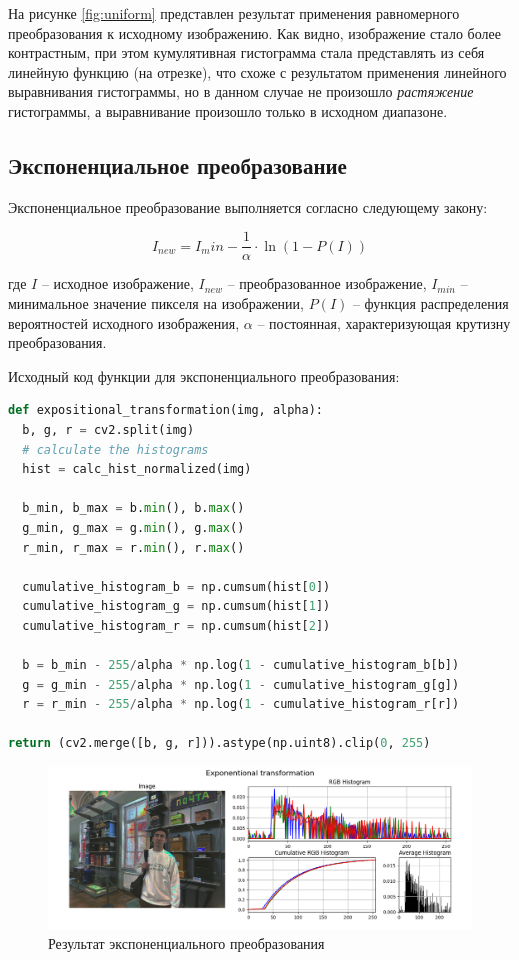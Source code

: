 На рисунке \ref{fig:uniform} представлен результат применения равномерного преобразования к исходному изображению. 
Как видно, изображение стало более контрастным, при этом кумулятивная гистограмма стала представлять из себя
линейную функцию (на отрезке), что схоже с результатом применения линейного выравнивания гистограммы, но 
в данном случае не произошло \textit{растяжение} гистограммы, а выравнивание произошло только в исходном диапазоне. 


\subsection{Экспоненциальное преобразование}

Экспоненциальное преобразование выполняется согласно следующему закону:

\begin{equation}
  I_{new} = I_min - \frac{1}{\alpha} \cdot \ln(1 - P(I))
\end{equation}

где $I$ -- исходное изображение, $I_{new}$ -- преобразованное изображение, 
$I_{min}$ -- минимальное значение пикселя на изображении, 
$P(I)$ -- функция распределения вероятностей исходного изображения,
$\alpha$ -- постоянная, характеризующая крутизну преобразования. 

Исходный код функции для экспоненциального преобразования:

\begin{lstlisting}[language=Python]
def expositional_transformation(img, alpha):
  b, g, r = cv2.split(img)
  # calculate the histograms
  hist = calc_hist_normalized(img)

  b_min, b_max = b.min(), b.max()
  g_min, g_max = g.min(), g.max()
  r_min, r_max = r.min(), r.max()

  cumulative_histogram_b = np.cumsum(hist[0]) 
  cumulative_histogram_g = np.cumsum(hist[1])
  cumulative_histogram_r = np.cumsum(hist[2])

  b = b_min - 255/alpha * np.log(1 - cumulative_histogram_b[b]) 
  g = g_min - 255/alpha * np.log(1 - cumulative_histogram_g[g]) 
  r = r_min - 255/alpha * np.log(1 - cumulative_histogram_r[r]) 

return (cv2.merge([b, g, r])).astype(np.uint8).clip(0, 255)
\end{lstlisting}

\begin{figure}[H]
    \centering
    \includegraphics[width=\textwidth]{../results/Exponentional transformation.png}
    \caption{Результат экспоненциального преобразования}
    \label{fig:exponentional}
\end{figure}

